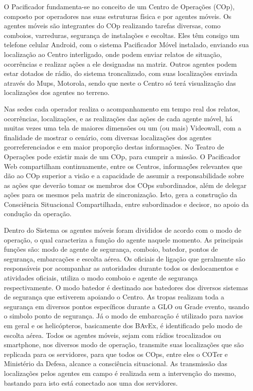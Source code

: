 O Pacificador fundamenta-se no conceito de um Centro de Operações (COp), composto por operadores nas suas estruturas física e por agentes móveis. Os agentes móveis são integrantes do COp realizando tarefas diversas, como comboios, varreduras, segurança de instalações e escoltas. Eles têm consigo um telefone celular Android, com o sistema Pacificador Móvel instalado,  enviando sua localização ao Centro interligado, onde podem enviar relatos de situação, ocorrências e realizar ações a ele designadas na matriz. Outros agentes podem estar dotados de rádio, do sistema troncalizado, com suas localizações enviada através do Mups, Motorola, sendo que neste o Centro só terá visualização das localizações dos agentes no terreno.

Nas sedes cada operador realiza o acompanhamento em tempo real dos relatos, ocorrências, localizações, e as realizações das ações de cada agente móvel, há muitas vezes uma tela de maiores dimensões ou um (ou mais) Videowall, com a finalidade de mostrar o cenário, com diversas localizações dos agentes georreferenciados e em maior proporção destas informações. No Teatro de Operações pode existir mais de um COp, para cumprir a missão. O Pacificador Web compartilham continuamente, entre os Centros, informaçṍes relevantes que dão ao COp superior a visão e a capacidade de assumir a responsabilidade sobre as ações que deverão tomar os membros dos COps subordinados, além de delegar ações para os mesmos pela matriz de sincronização. Isto, gera a construção da Consciência Situacional Compartilhada, entre subordinados e decisor, no apoio da condução da operação.

Dentro do Sistema os agentes móveis foram divididos de acordo com o modo de operação, o qual caracteriza a função do agente naquele momento. As principais funções são: modo de agente de segurança, comboio, batedor, pontos de segurança, embarcações e escolta aérea. Os oficiais de ligação que geralmente são responsáveis por acompanhar as autoridades durante todos os deslocamentos e atividades oficiais, utiliza o modo comboio e agente de segurança respectivamente. O modo batedor é destinado aos batedores dos diversos sistemas de segurança que estiverem apoiando o Centro. As tropas realizam toda a segurança em diversos pontos específicos durante a GLO ou Grade evento, usando o simbolo ponto de segurança. Já o modo de embarcação é utilizado para navios em geral e os helicópteros, basicamente dos BAvEx, é identificado pelo modo de escolta aérea. Todos os agentes móveis, sejam com rádios trocalizados ou smartphone, nos diversos modo de operação, transmite suas localizações que são replicada para os servidores, para que todos os COps, entre eles o COTer e Ministério da Defesa, alcance a consciência situacional. As transmissão das localizações pelos agentes em campo é realizada sem a intervenção do mesmo, bastando para isto está conectado aos uma dos servidores.

